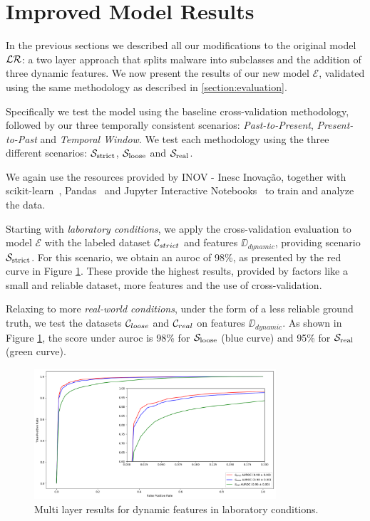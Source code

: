 \section{Improved Model Results}
\label{section:improvements_results}

In the previous sections we described all our modifications to the original model $\mathcal{LR}$: a two layer approach that splits malware into subclasses and the addition of three dynamic features.
We now present the results of our new model $\mathcal{E}$, validated using the same methodology as described in \ref{section:evaluation}.

Specifically we test the model using the baseline cross-validation methodology, followed by our three temporally consistent scenarios: \textit{Past-to-Present}, \textit{Present-to-Past} and \textit{Temporal Window}.
We test each methodology using the three different scenarios: $\mathcal{S}_{\mathrm{strict}}$, $\mathcal{S}_{\mathrm{loose}}$ and $\mathcal{S}_{\mathrm{real}}$.

We again use the resources provided by INOV - Inesc Inovação, together with scikit-learn~\cite{tool:sklearn}, Pandas~\cite{tool:pandas} and Jupyter Interactive Notebooks~\cite{tool:jupyter} to train and analyze the data.

\medskip

Starting with \textit{laboratory conditions}, we apply the cross-validation evaluation to model $\mathcal{E}$ with the labeled dataset $\mathcal{C}_{strict}$ and features $\DD_{dynamic}$, providing scenario $\mathcal{S}_{\mathrm{strict}}$.
For this scenario, we obtain an \gls{auroc} of 98\%, as presented by the red curve in Figure \ref{fig:improved_xval}.
These provide the highest results, provided by factors like a small and reliable dataset, more features and the use of cross-validation.

Relaxing to more \textit{real-world conditions}, under the form of a less reliable ground truth, we test the datasets $\mathcal{C}_{loose}$ and $\mathcal{C}_{real}$ on features $\DD_{dynamic}$.
As shown in Figure \ref{fig:improved_xval}, the score under \gls{auroc} is 98\% for $\mathcal{S}_{\mathrm{loose}}$ (blue curve) and 95\% for $\mathcal{S}_{\mathrm{real}}$ (green curve).

\begin{figure}[!h]
	\centering
	\includegraphics[width=0.8\textwidth]{Figures/xval_improved.png}
	\caption{Multi layer results for dynamic features in laboratory conditions.}
	\label{fig:improved_xval}
\end{figure}

